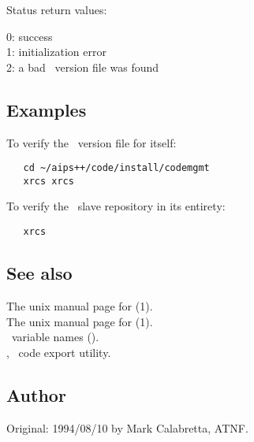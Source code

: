 Status return values:
\begin{status}
   0: success\\
   1: initialization error\\
   2: a bad \rcs\ version file was found
\end{status}

\subsection*{Examples}

To verify the \rcs\ version file for  itself:

\begin{verbatim}
   cd ~/aips++/code/install/codemgmt
   xrcs xrcs
\end{verbatim}

To verify the \aipspp\ slave repository in its entirety:

\begin{verbatim}
   xrcs
\end{verbatim}

\subsection*{See also}

The unix manual page for (1).\\
The unix manual page for (1).\\
\aipspp\ variable names ().\\
, \aipspp\ code export utility.

\subsection*{Author}

Original: 1994/08/10 by Mark Calabretta, ATNF.
